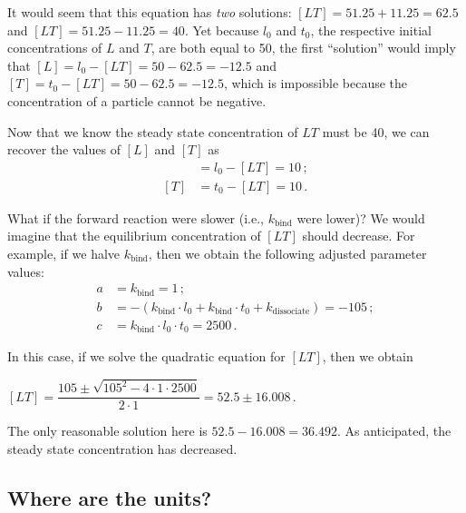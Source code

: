 It would seem that this equation has \textit{two} solutions: $[LT] = 51.25 + 11.25 = 62.5$ and $[LT] = 51.25 - 11.25 = 40$. Yet because $l_0$ and $t_0$, the respective initial concentrations of $L$ and $T$, are both equal to 50, the first ``solution'' would imply that $[L] = l_0 - [LT] = 50 - 62.5 = -12.5$ and $[T] = t_0 - [LT] = 50 - 62.5 = -12.5$, which is impossible because the concentration of a particle cannot be negative. 

Now that we know the steady state concentration of $LT$ must be 40, we can recover the values of $[L]$ and $[T]$ as
\begin{align*}
[L] & = l_0 - [LT] = 10\,;\\
[T] & = t_0 - [LT] = 10\,.
\end{align*}

What if the forward reaction were slower (i.e., $k_\text{bind}$ were lower)? We would imagine that the equilibrium concentration of $[LT]$ should decrease. For example, if we halve $k_\text{bind}$, then we obtain the following adjusted parameter values:
\begin{align*}
a & = k_\text{bind} = 1\,;\\
b & = - (k_\text{bind} \cdot l_0 + k_\text{bind} \cdot t_0 + k_\text{dissociate}) = -105\,;\\
c & = k_\text{bind} \cdot l_0 \cdot t_0 = 2500\,.
\end{align*}

\noindent In this case, if we solve the quadratic equation for $[LT]$, then we obtain

\begin{center}
$[LT] = \dfrac{105 \pm \sqrt{105^2 - 4 \cdot 1 \cdot 2500}}{2 \cdot 1} = 52.5 \pm 16.008$\,.
\end{center}

\noindent The only reasonable solution here is $52.5-16.008 = 36.492$. As anticipated, the steady state concentration has decreased.\\

\begin{qbox}\end{qbox}

\FloatBarrier
{}
\subsection{Where are the units?}

